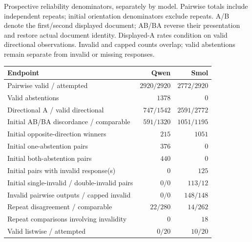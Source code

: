 \begin{supplementtable}
\caption{Prospective reliability denominators, separately by model. Pairwise totals include independent repeats; initial orientation denominators exclude repeats. A/B denote the first/second displayed document; AB/BA reverse their presentation and restore actual document identity. Displayed-A rates condition on valid directional observations. Invalid and capped counts overlap; valid abstentions remain separate from invalid or missing responses.}
\label{tab:reliability-detail}\sncstable
\begin{tabularx}{\linewidth}{@{}Yrr@{}}\toprule
Endpoint & Qwen & Smol \\\midrule
Pairwise valid / attempted & $2920/2920$ & $2772/2920$ \\
Valid abstentions & $1378$ & $0$ \\
Directional A / valid directional & $747/1542$ & $2591/2772$ \\
Initial AB/BA discordance / comparable & $591/1320$ & $1051/1195$ \\
Initial opposite-direction winners & $215$ & $1051$ \\
Initial one-abstention pairs & $376$ & $0$ \\
Initial both-abstention pairs & $440$ & $0$ \\
Initial pairs with invalid response(s) & $0$ & $125$ \\
Initial single-invalid / double-invalid pairs & $0/0$ & $113/12$ \\
Invalid pairwise outputs / capped invalid & $0/0$ & $148/148$ \\
Repeat disagreement / comparable & $22/280$ & $14/262$ \\
Repeat comparisons involving invalidity & $0$ & $18$ \\
Valid listwise / attempted & $0/20$ & $10/20$ \\\bottomrule
\end{tabularx}
\end{supplementtable}